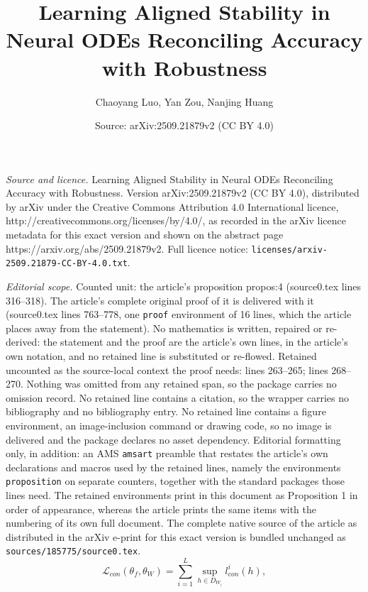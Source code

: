 \documentclass[10pt,a4paper]{amsart}
\title{Learning Aligned Stability in Neural ODEs Reconciling Accuracy with Robustness}
\author{Chaoyang Luo, Yan Zou, Nanjing Huang}
\date{Source: arXiv:2509.21879v2 (CC BY 4.0)}
\begin{document}
\maketitle

\noindent\emph{Source and licence.} Learning Aligned Stability in Neural ODEs Reconciling Accuracy with Robustness. Version arXiv:2509.21879v2 (CC BY 4.0), distributed by arXiv under the Creative Commons Attribution 4.0 International licence, http://creativecommons.org/licenses/by/4.0/, as recorded in the arXiv licence metadata for this exact version and shown on the abstract page https://arxiv.org/abs/2509.21879v2. Full licence notice: \texttt{licenses/arxiv-2509.21879-CC-BY-4.0.txt}.\par\smallskip

\noindent\textit{Editorial scope.} Counted unit: the article's proposition propos:4 (source0.tex lines 316--318). The article's complete original proof of it is delivered with it (source0.tex lines 763--778, one \texttt{proof} environment of 16 lines, which the article places away from the statement). No mathematics is written, repaired or re-derived: the statement and the proof are the article's own lines, in the article's own notation, and no retained line is substituted or re-flowed.  Retained uncounted as the source-local context the proof needs: lines 263--265; lines 268--270.  Nothing was omitted from any retained span, so the package carries no omission record.  No retained line contains a citation, so the wrapper carries no bibliography and no bibliography entry.  No retained line contains a figure environment, an image-inclusion command or drawing code, so no image is delivered and the package declares no asset dependency.  Editorial formatting only, in addition: an AMS \texttt{amsart} preamble that restates the article's own declarations and macros used by the retained lines, namely the environments \texttt{proposition} on separate counters, together with the standard packages those lines need.  The retained environments print in this document as Proposition 1 in order of appearance, whereas the article prints the same items with the numbering of its own full document.  The complete native source of the article as distributed in the arXiv e-print for this exact version is bundled unchanged as \texttt{sources/185775/source0.tex}.
\begin{equation}\label{eq:3.4}
	{\mathcal{L}_{con}}\left( \theta_f,\theta_W  \right) = \sum\limits_{i = 1}^L {\mathop {\sup }\limits_{h \in {D_{W_i}}} l_{con}^i(h)},
\end{equation}
\end{document}
